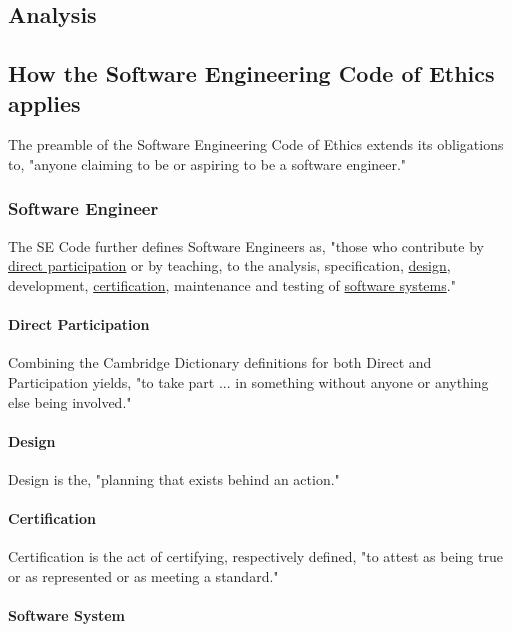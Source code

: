 \documentclass[12pt]{article}
\begin{document}
\begin{multicols}{2}
\section{Analysis }

\subsection{How the Software Engineering Code of Ethics applies}

The preamble of the Software Engineering Code of Ethics extends its obligations to, "anyone claiming to be or aspiring to be a software engineer."\cite{softwareEngineeringCodeOfEthics}

\subsubsection{Software Engineer}

The SE Code further defines Software Engineers as, "those who contribute by \underline{direct participation} or by teaching, to the analysis, specification, \underline{design}, development, \underline{certification}, maintenance and testing of \underline{software systems}."

\paragraph{Direct Participation}

Combining the Cambridge Dictionary definitions for both Direct and Participation yields, "to take part ... in something without anyone or anything else being involved."\cite{participationDefinition}\cite{directDefinition}

\paragraph{Design}
Design is the, "planning that exists behind an action."\cite{designDefinition}

\paragraph{Certification}
Certification is the act of certifying, respectively defined, "to attest as being true or as represented or as meeting a standard."\cite{certifyingDefinition}

\paragraph{Software System}


\end{multicols}
\end{document}
